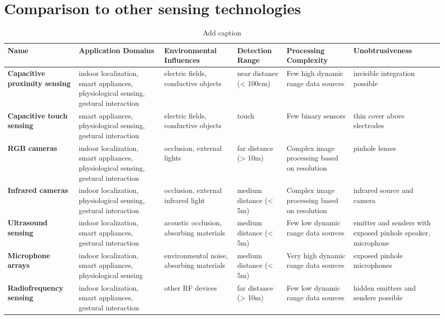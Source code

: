 \section{Comparison to other sensing technologies}

\begin{table}[htbp]
  \centering
  \footnotesize
  \caption{Add caption}
    \begin{tabularx}{\linewidth}{Xp{4cm}XXXX}
    \toprule
    \textbf{Name} & \textbf{Application Domains} & \textbf{Environmental Influences} & \textbf{Detection Range} & \textbf{Processing Complexity} & \textbf{Unobtrusiveness} \\
    \midrule
    \textbf{Capacitive proximity sensing} & indoor localization, smart appliances, physiological sensing, gestural interaction & electric fields, conductive objects & near distance   (< 100cm) & Few high dynamic range data sources  & invisible integration possible \\
    \textbf{Capacitive touch sensing} & smart appliances, physiological sensing, gestural interaction & electric fields, conductive objects & touch  & Few binary sensors & thin cover above electrodes \\
    \textbf{RGB cameras } & indoor localization, smart appliances, physiological sensing, gestural interaction & occlusion, external lights & far distance     (> 10m) & Complex image processing based on resolution & pinhole lenses \\
    \textbf{Infrared cameras} & indoor localization, physiological sensing, gestural interaction & occlusion, external infrared light & medium distance (< 5m) & Complex image processing based on resolution & infrared source and camera \\
    \textbf{Ultrasound sensing} & indoor localization, smart appliances, gestural interaction & acoustic occlusion, absorbing materials & medium distance (< 5m) & Few low dynamic range data sources & emitter and senders with exposed pinhole speaker, microphone \\
    \textbf{Microphone arrays} & indoor localization, smart appliances, physiological sensing & environmental noise, absorbing materials & medium distance (< 5m) & Very high dynamic range data sources & exposed pinhole microphones \\
    \textbf{Radiofrequency sensing} & indoor localization, smart appliances, gestural interaction & other RF devices & far distance     (> 10m) & Few low dynamic range data sources & hidden emitters and senders possible \\
    \bottomrule
    \end{tabularx}%
  \label{tab:addlabel}%
\end{table}%



